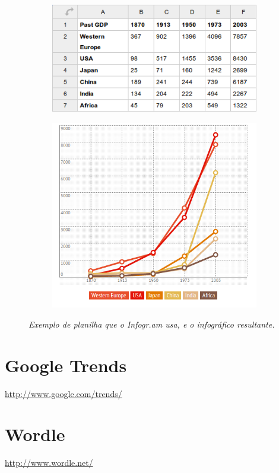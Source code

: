 \documentclass[12pt,onecolumn]{article}
\begin{document}
  \begin{figure}[H]
    \centering
    \begin{subfigure}{\textwidth}
      \centering
      \includegraphics[width=.9\linewidth]{infogram-sample-spreadsheet.png}
      \label{fig:infogram-sample-spreadsheet}
    \end{subfigure}
    \begin{subfigure}{\textwidth}
      \centering
      \includegraphics[width=.9\linewidth]{infogram-sample-chart.png}
      \label{fig:infogram-sample-chart}
    \end{subfigure}
    \caption{
      \footnotesize
      \it
      Exemplo de planilha que o Infogr.am usa, e o infográfico resultante.
    }
  \end{figure}

\clearpage
\section{Google Trends}
  \url{http://www.google.com/trends/}

\clearpage
\section{Wordle}
  \url{http://www.wordle.net/}
\end{document}
